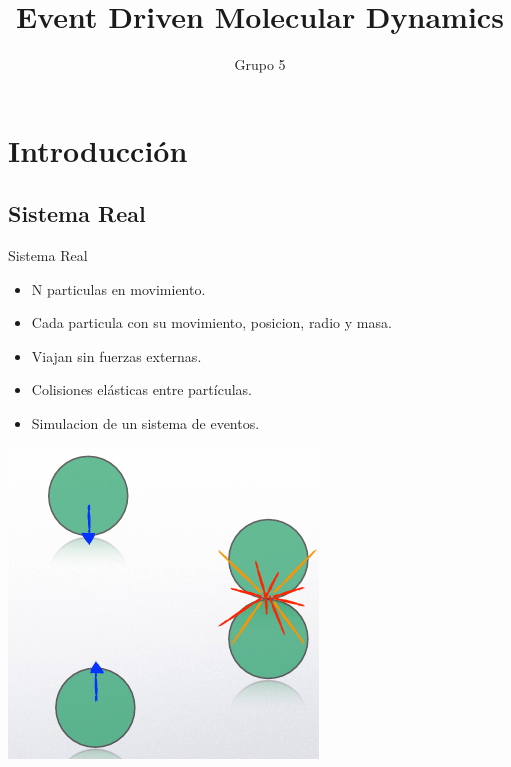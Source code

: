\documentclass{beamer}
\title{Event Driven Molecular Dynamics}
\author{Grupo 5}
\institute{ITBA}
\date{} %
\begin{document}
\begin{frame}
  \titlepage
\end{frame}

\section{Introducción}

\subsection{Sistema Real}
\begin{frame}{Sistema Real}
  \begin{itemize}
    \item N particulas en movimiento.
    \item Cada particula con su movimiento, posicion, radio y masa.
    \item Viajan sin fuerzas externas.
    \item Colisiones elásticas entre partículas.
    \item Simulacion de un sistema de eventos.
  \end{itemize}
  \begin{center}
    \includegraphics[width=0.3\linewidth]{photoMaterial/eventos_sistema_real.png}
  \end{center}
\end{frame}
\end{document}
